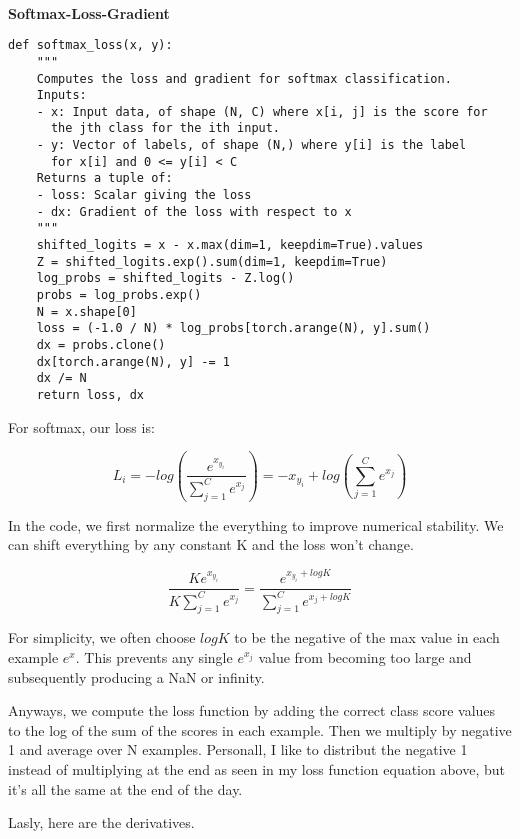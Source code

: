 \documentclass[12pt]{article}
\begin{document}
\paragraph{}
\textbf{Softmax-Loss-Gradient}
\begin{verbatim}
def softmax_loss(x, y):
    """
    Computes the loss and gradient for softmax classification.
    Inputs:
    - x: Input data, of shape (N, C) where x[i, j] is the score for
      the jth class for the ith input.
    - y: Vector of labels, of shape (N,) where y[i] is the label
      for x[i] and 0 <= y[i] < C
    Returns a tuple of:
    - loss: Scalar giving the loss
    - dx: Gradient of the loss with respect to x
    """
    shifted_logits = x - x.max(dim=1, keepdim=True).values
    Z = shifted_logits.exp().sum(dim=1, keepdim=True)
    log_probs = shifted_logits - Z.log()
    probs = log_probs.exp()
    N = x.shape[0]
    loss = (-1.0 / N) * log_probs[torch.arange(N), y].sum()
    dx = probs.clone()
    dx[torch.arange(N), y] -= 1
    dx /= N
    return loss, dx
\end{verbatim}

For softmax, our loss is: 

\begin{equation}
    L_{i} = -log(\frac{e^{x_{y_{i}}}}{\sum_{j=1}^C e^{x_j}}) 
    = -x_{y_{i}} + log(\sum_{j=1}^C e^{x_{j}})
\end{equation}

In the code, we first normalize the everything to improve numerical stability. 
We can shift everything by any constant K and the loss won't change. 

\begin{equation}
    \frac{K e^{x_{y_{i}}}}{K \sum_{j=1}^C e^{x_j}} = 
    \frac{e^{x_{y_{i}} + logK}}{\sum_{j=1}^C e^{x_j + log K}} 
\end{equation}

For simplicity, we often choose $log K$ to be the negative of the max value in each example 
$e^x$. This prevents any single $e^{x_j}$ value from becoming too large
and subsequently producing a NaN or infinity. 

Anyways, we compute the loss function by adding the correct class score values
to the log of the sum of the scores in each example. Then we multiply by negative 1
and average over N examples. Personall, I like to distribut the negative 1 instead 
of multiplying at the end as seen in my loss function equation above, but it's all
the same at the end of the day. 

Lasly, here are the derivatives. 
\end{document}
